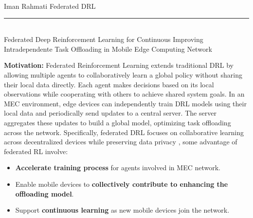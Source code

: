 \documentclass[12pt]{article}
\begin{document}
	

	
%

\begin{center} 
	
	
	\vspace{-17mm}
	
	\large Iman Rahmati  \hfill Federated DRL \vspace{1mm} \hrule
	
	\vspace{-1mm}
	
	
	
	
	\textcolor{white}{i} \\ \LARGE Federated Deep Reinforcement Learning for Continuous Improving Intradependente Task Offloading in Mobile Edge Computing Network\vspace{6mm}\\
	
\end{center}
\vspace{-5mm}
\small
\noindent\textbf{\large Motivation:  } 
Federated Reinforcement Learning extends traditional DRL by allowing multiple agents to collaboratively learn a global policy without sharing their local data directly. Each agent makes decisions based on its local observations while cooperating with others to achieve shared system goals. In an MEC environment, edge devices can independently train DRL models using their local data and periodically send updates to a central server. The server aggregates these updates to build a global model, optimizing task offloading across the network. Specifically, federated DRL focuses on collaborative learning across decentralized devices while preserving data privacy \cite{lim2020federated}, some advantage of federated RL involve: 
\vspace{-2mm}
\begin{itemize}
	
	\item \textbf{Accelerate training process} for agents involved in MEC network. \vspace{-2mm}
	\item Enable mobile devices to  \textbf{collectively contribute to enhancing the offloading model}.\vspace{-2mm}
	\item Support  \textbf{continuous learning} as new mobile devices join the network.\vspace{-2mm}
\end{itemize}
\end{document}
